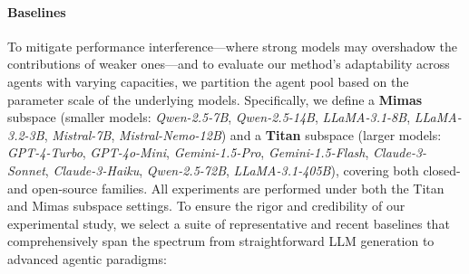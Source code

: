 \documentclass{article}
\begin{document}
\paragraph{Baselines}
To mitigate performance interference—where strong models may overshadow the contributions of weaker ones—and to evaluate our method’s adaptability across agents with varying capacities, we partition the agent pool based on the parameter scale of the underlying models. Specifically, we define a \textbf{Mimas} subspace (smaller models: \emph{Qwen-2.5-7B}, \emph{Qwen-2.5-14B}, \emph{LLaMA-3.1-8B}, \emph{LLaMA-3.2-3B}, \emph{Mistral-7B}, \emph{Mistral-Nemo-12B}) and a \textbf{Titan} subspace (larger models: \emph{GPT-4-Turbo}, \emph{GPT-4o-Mini}, \emph{Gemini-1.5-Pro}, \emph{Gemini-1.5-Flash}, \emph{Claude-3-Sonnet}, \emph{Claude-3-Haiku}, \emph{Qwen-2.5-72B}, \emph{LLaMA-3.1-405B}), covering both closed- and open-source families. All experiments are performed under both the Titan and Mimas subspace settings.
To ensure the rigor and credibility of our experimental study, we select a suite of representative and recent baselines that comprehensively span the spectrum from straightforward LLM generation to advanced agentic paradigms:
\end{document}
